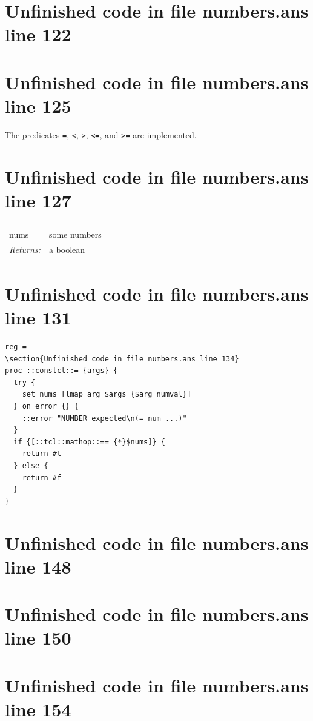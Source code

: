 \documentclass[twoside,9pt]{report}
\begin{document}
\section{Unfinished code in file numbers.ans line 122}

\section{Unfinished code in file numbers.ans line 125}

The predicates \texttt{=}, \texttt{<}, \texttt{>}, \texttt{<=}, and \texttt{>=} are implemented.

\section{Unfinished code in file numbers.ans line 127}
\noindent\begin{tabular}{ |p{1.9cm} p{8cm}| }
\hline
\rowcolor[HTML]{CCCCCC} \multicolumn{2}{|l|}{\bf =, <, >, <=, >= (public)} \\
nums & some numbers \\
\textit{Returns:} & a boolean \\
\hline
\end{tabular}
\section{Unfinished code in file numbers.ans line 131}
\begin{lstlisting}
reg =
\section{Unfinished code in file numbers.ans line 134}
proc ::constcl::= {args} {
  try {
    set nums [lmap arg $args {$arg numval}]
  } on error {} {
    ::error "NUMBER expected\n(= num ...)"
  }
  if {[::tcl::mathop::== {*}$nums]} {
    return #t
  } else {
    return #f
  }
}
\end{lstlisting}
\section{Unfinished code in file numbers.ans line 148}
\section{Unfinished code in file numbers.ans line 150}
\section{Unfinished code in file numbers.ans line 154}
\end{document}
